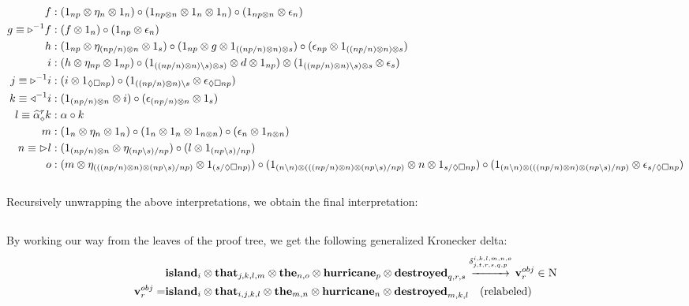 \documentclass[]{article}
\newcommand{\Wv}[1]{\mathbf{#1}}
\newcommand{\bs}{\backslash}
\newcommand{\Xrighta}{\widehat{\alpha}_{\diamond}^{r}}
\newcommand{\ld}{\triangleleft ^{-1}}
\newcommand{\rd}{\triangleright ^{-1}}
\begin{document}
\begin{align}
f &: (1_{np} \otimes \eta_n \otimes 1_n) \circ (1_{np \otimes n} \otimes 1_n \otimes 1_n) \circ (1_{np \otimes n} \otimes \epsilon_n)\\
g \equiv \rd f &: (f \otimes 1_n) \circ (1_{np} \otimes \epsilon_n)\\
h &: (1_{np} \otimes \eta_{(np/n) \otimes n} \otimes 1_s) \circ (1_{np} \otimes g \otimes 1_{((np/n) \otimes n) \otimes s}) \circ (\epsilon_{np} \otimes 1_{((np/n) \otimes n) \otimes s})\\
i &: (h \otimes \eta_{np} \otimes 1_{np}) \circ (1_{((np/n)\otimes n) \bs s) \otimes s)} \otimes d \otimes 1_{np}) \otimes (1_{((np/n) \otimes n) \bs s) \otimes s} \otimes \epsilon_{s})\\
j \equiv \rd i &: (i \otimes 1_{\Diamond \Box np}) \circ (1_{((np/n) \otimes n) \bs s} \otimes \epsilon_{\Diamond \Box np})\\
k \equiv \ld i &: (1_{(np/n) \otimes n} \otimes i) \circ (\epsilon_{(np/n) \otimes n} \otimes 1_{s})\\
l \equiv \Xrighta{k} &: \alpha \circ k\\
m &: (1_{n} \otimes \eta_{n} \otimes 1_{n}) \circ (1_{n} \otimes 1_{n} \otimes 1_{n \otimes n}) \circ (\epsilon_{n} \otimes 1_{n \otimes n})\\
n \equiv \rhd l &: (1_{(np/n) \otimes n} \otimes \eta_{(np \bs s)/np}) \circ (l \otimes 1_{(np \bs s)/np})\\
o &: (m \otimes \eta_{(((np/n) \otimes n) \otimes (np \bs s)/np)} \otimes 1_{(s/\Diamond \Box np)}) \circ (1_{ (n \bs n) \otimes (((np/n) \otimes n) \otimes (np \bs s)/np)} \otimes n \otimes 1_{s/\Diamond \Box np}) \circ (1_{ (n \bs n) \otimes (((np/n) \otimes n) \otimes (np \bs s)/np)} \otimes \epsilon_{s/\Diamond \Box np}) \notag \\
\end{align}
\\
Recursively unwrapping the above interpretations, we obtain the final interpretation:
\subsection{}
By working our way from the leaves of the proof tree, we get the following generalized Kronecker delta:
\begin{align*}
& \Wv{island}_{i}\otimes\Wv{that}_{j,k,l,m}\otimes\Wv{the}_{n,o}\otimes\Wv{hurricane}_{p}\otimes\Wv{destroyed}_{q,r,s}
\overset{\delta^{i,k,l,m,n,o}_{j,t,r,s,q,p}}{\xrightarrow{\hspace*{1cm}}}
\Wv{v}_r^{obj} \in \textsc{N} \\
\Wv{v}_r^{obj} = & \Wv{island}_{i}\otimes\Wv{that}_{i,j,k,l}\otimes\Wv{the}_{m,n}\otimes\Wv{hurricane}_{n}\otimes\Wv{destroyed}_{m,k,l} \quad \text{(relabeled)} 
\end{align*}
\end{document}
